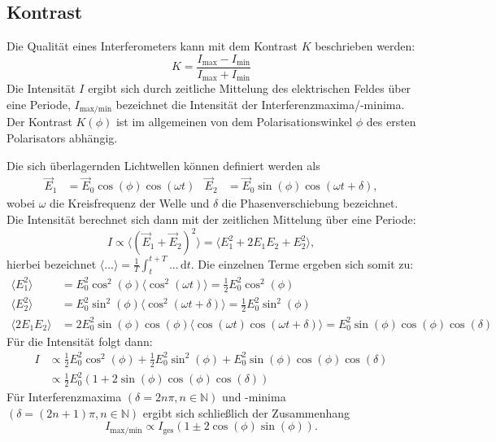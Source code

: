 \subsection{Kontrast}

\noindent Die Qualität eines Interferometers kann mit dem Kontrast $K$ beschrieben werden:
\begin{equation}
        K = \frac{I_{\text{max}} - I_{\text{min}}}{I_{\text{max}} + I_{\text{min}}}
        \label{eqn:kontrast}
\end{equation}
Die Intensität $I$ ergibt sich durch zeitliche Mittelung des elektrischen Feldes über eine Periode, $I_{\text{max/min}}$  bezeichnet die Intensität der Interferenzmaxima/-minima.
Der Kontrast $K(\phi)$ ist im allgemeinen von dem Polarisationswinkel $\phi$ des ersten Polarisators abhängig. 

\noindent Die sich überlagernden Lichtwellen können definiert werden als 
\begin{align}
    \vec{E}_1 &= \vec{E}_0 \cos(\phi)\cos(\omega t) & \vec{E}_2 &= \vec{E}_0 \sin(\phi)\cos(\omega t + \delta),
\end{align} 
wobei $\omega$ die Kreisfrequenz der Welle und $\delta$ die Phasenverschiebung bezeichnet. Die Intensität berechnet sich dann mit der zeitlichen Mittelung über eine Periode:
\begin{equation*}
    I  \propto \langle \left( \vec{E}_1 + \vec{E}_2 \right)^2 \rangle = \langle E_1^2 + 2 E_1 E_2 + E_2^2 \rangle, 
\end{equation*} 
hierbei bezeichnet $\langle ... \rangle = \frac{1}{T} \int_t^{t+T} ... \, \text{d}t$. 
Die einzelnen Terme ergeben sich somit zu:
\begin{align*}
    \langle E_1^2 \rangle &= E_0^2 \cos^2(\phi) \langle \cos^2(\omega t) \rangle = \frac{1}{2} E_0^2 \cos^2(\phi) \\
    \langle E_2^2 \rangle &= E_0^2 \sin^2(\phi) \langle \cos^2(\omega t + \delta) \rangle = \frac{1}{2} E_0^2 \sin^2(\phi) \\
    \langle 2 E_1 E_2 \rangle &= 2 E_0^2 \sin(\phi)\cos(\phi) \langle \cos(\omega t) \cos(\omega t + \delta) \rangle = E_0^2 \sin(\phi) \cos(\phi) \cos(\delta) 
\end{align*}
Für die Intensität folgt dann:
\begin{align*}
    I &\propto  \frac{1}{2} E_0^2 \cos^2(\phi) + \frac{1}{2} E_0^2 \sin^2(\phi) + E_0^2 \sin(\phi) \cos(\phi) \cos(\delta)\\
    & \propto \frac{1}{2} E_0^2 \left( 1 + 2 \sin(\phi) \cos(\phi) \cos(\delta) \right)
\end{align*}
Für Interferenzmaxima $\left( \delta = 2n\pi, n \in \mathbb{N} \right)$ und -minima $\left(\delta = (2n+1)\pi, n \in \mathbb{N} \right)$ ergibt sich schließlich der Zusammenhang 
\begin{equation*}
    I_{\text{max/min}} \propto I_{\text{ges}} \left( 1 \pm 2 \cos(\phi)\sin(\phi)\right) . 
\end{equation*}


